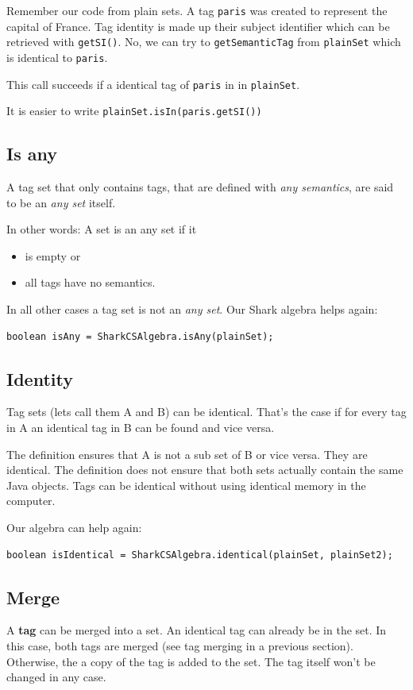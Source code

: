 Remember our code from plain sets. A tag {\tt paris} was created to represent the capital of France. Tag identity is made up their subject identifier which can be retrieved with {\tt getSI()}. No, we can try to {\tt getSemanticTag} from {\tt plainSet} which is identical to {\tt paris}. 

This call succeeds if a identical tag of {\tt paris} in in {\tt plainSet}.

It is easier to write {\verb|plainSet.isIn(paris.getSI())|}

\subsection{Is any}
A tag set that only contains tags, that are defined with {\it any semantics}, are said to be an {\it any set} itself.

In other words: A set is an any set if it 

\begin{itemize}
    \item is empty or
\item
all tags have no semantics.
\end{itemize}

In all other cases a tag set is not an {\it any set}. Our Shark algebra helps again:

\begin{verbatim}
boolean isAny = SharkCSAlgebra.isAny(plainSet);
\end{verbatim}

\subsection{Identity}

Tag sets (lets call them A and B) can be identical. That's the case if for every tag in A an identical tag in B can be found and vice versa.

The definition ensures that A is not a sub set of B or vice versa. They are identical. The definition does not ensure that both sets actually contain the same Java objects. Tags can be identical without using identical memory in the computer.

Our algebra can help again:

\begin{verbatim}
boolean isIdentical = SharkCSAlgebra.identical(plainSet, plainSet2);
\end{verbatim}

\subsection{Merge}
A {\bf tag} can be merged into a set. An identical tag can already be in the set. In this case, both tags are merged (see tag merging in a previous section). Otherwise, the a copy of the tag is added to the set. The tag itself won't be changed in any case.

